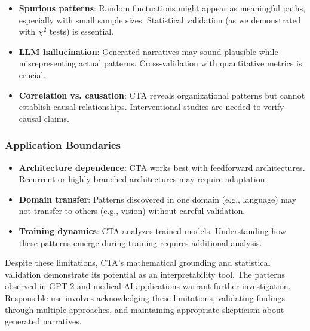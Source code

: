 \begin{itemize}
    \item \textbf{Spurious patterns}: Random fluctuations might appear as meaningful paths, especially with small sample sizes. Statistical validation (as we demonstrated with $\chi^2$ tests) is essential.
    \item \textbf{LLM hallucination}: Generated narratives may sound plausible while misrepresenting actual patterns. Cross-validation with quantitative metrics is crucial.
    \item \textbf{Correlation vs. causation}: CTA reveals organizational patterns but cannot establish causal relationships. Interventional studies are needed to verify causal claims.
\end{itemize}

\subsubsection{Application Boundaries}

\begin{itemize}
    \item \textbf{Architecture dependence}: CTA works best with feedforward architectures. Recurrent or highly branched architectures may require adaptation.
    \item \textbf{Domain transfer}: Patterns discovered in one domain (e.g., language) may not transfer to others (e.g., vision) without careful validation.
    \item \textbf{Training dynamics}: CTA analyzes trained models. Understanding how these patterns emerge during training requires additional analysis.
\end{itemize}

Despite these limitations, CTA's mathematical grounding and statistical validation demonstrate its potential as an interpretability tool. The patterns observed in GPT-2 and medical AI applications warrant further investigation. Responsible use involves acknowledging these limitations, validating findings through multiple approaches, and maintaining appropriate skepticism about generated narratives.

